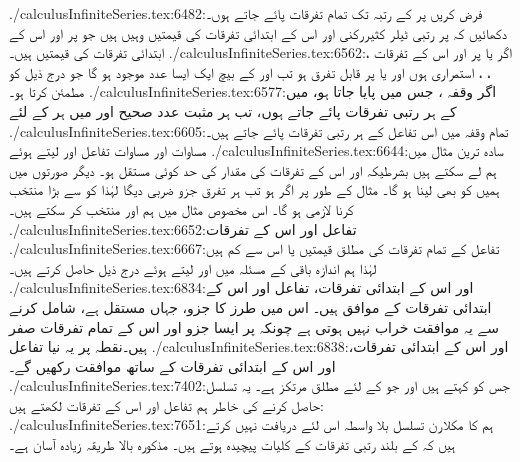 ./calculusInfiniteSeries.tex:6482:فرض کریں  پر  کے  رتبہ تک تمام تفرقات پائے جاتے ہوں۔ دکھائیں کہ  پر  رتبی ٹیلر کثیررکنی اور اس کے ابتدائی  تفرقات کی قیمتیں وہیں ہیں جو  پر  اور اس کے ابتدائی  تفرقات کی قیمتیں ہیں۔ 
./calculusInfiniteSeries.tex:6562:اگر  یا  پر  اور اس کے  تفرقات ، ، ،  استمراری ہوں اور  یا  پر  قابل تفرق ہو تب  اور  کے بیچ ایک ایسا عدد  موجود ہو گا جو درج ذیل کو مطمئن کرتا ہو۔
./calculusInfiniteSeries.tex:6577:اگر وقفہ ، جس میں  پایا جاتا ہو، میں  کے ہر رتبی تفرقات پائے جاتے ہوں، تب ہر مثبت عدد صحیح  اور  میں ہر  کے لئے
./calculusInfiniteSeries.tex:6605:تمام وقفہ  میں اس تفاعل کے ہر رتبی تفرقات پائے جاتے ہیں۔  مساوات  اور مساوات  تفاعل  اور  لیتے ہوئے
./calculusInfiniteSeries.tex:6644:سادہ ترین مثال میں ہم  لے سکتے ہیں بشرطیکہ  اور اس کے تفرقات کی مقدار کی حد کوئی مستقل  ہو۔ دیگر صورتوں میں ہمیں  کو بھی لینا ہو گا۔ مثال کے طور پر اگر  ہو تب ہر تفرق جزو ضربی  دیگا لہٰذا  کو  سے بڑا منتخب کرنا لازمی ہو گا۔ اس مخصوص مثال میں ہم  اور  منتخب کر سکتے ہیں۔
./calculusInfiniteSeries.tex:6652:تفاعل اور اس کے تفرقات
./calculusInfiniteSeries.tex:6667:تفاعل  کے تمام تفرقات کی مطلق قیمتیں  یا اس سے کم ہیں لہٰذا ہم اندازہ باقی کے مسئلہ میں  اور  لیتے ہوئے درج ذیل حاصل کرتے ہیں۔
./calculusInfiniteSeries.tex:6834:اور اس کے ابتدائی  تفرقات، تفاعل  اور اس کے ابتدائی  تفرقات کے موافق ہیں۔ اس میں  طرز کا جزو، جہاں  مستقل ہے، شامل کرنے سے یہ موافقت خراب نہیں ہوتی ہے چونکہ   پر ایسا جزو اور اس کے تمام تفرقات صفر ہیں۔نقطہ  پر یہ نیا تفاعل
./calculusInfiniteSeries.tex:6838:اور اس کے ابتدائی  تفرقات،  اور اس کے ابتدائی  تفرقات کے ساتھ موافقت رکھیں گے۔
./calculusInfiniteSeries.tex:7402:جس کو  کہتے ہیں اور جو  کے لئے مطلق مرتکز ہے۔ یہ تسلسل حاصل کرنے کی خاطر ہم تفاعل اور اس کے تفرقات لکھتے ہیں:
./calculusInfiniteSeries.tex:7651:ہم  کا مکلارن تسلسل بلا واسطہ اس لئے دریافت نہیں کرتے ہیں کہ  کے بلند رتبی تفرقات کے کلیات پیچیدہ ہوتے ہیں۔ مذکورہ بالا طریقہ زیادہ آسان ہے۔
